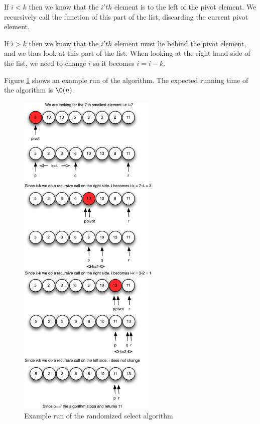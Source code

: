 \documentclass[10pt]{article}
\begin{document}
If $i<k$ then we know that the $i'th$ element is to the left of the pivot element. We recursively call the function of this part of the list, discarding the current pivot element.

If $i>k$ then we know that the $i'th$ element must lie behind the pivot element, and we thus look at this part of the list. When looking at the right hand side of the list, we need to change $i$ so it becomes $i = i-k$.

Figure \ref{fig10} shows an example run of the algorithm. The expected running time of the algorithm is $\O(n)$.

\begin{figure}[ht]
\centering
\includegraphics[width=0.6\textwidth]{figures/fig10.pdf}
\caption{Example run of the randomized select algorithm}
\label{fig10}
\end{figure}
\end{document}
